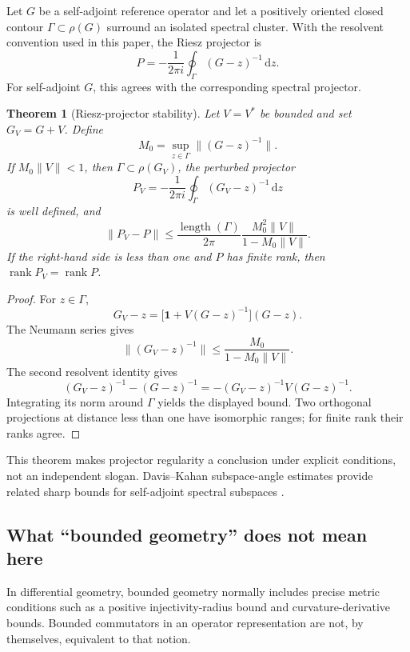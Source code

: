 \documentclass[11pt]{article}
\newtheorem{theorem}{Theorem}[section]
\theoremstyle{definition}
\theoremstyle{remark}
\newcommand{\1}{\mathbf 1}
\newcommand{\dd}{\mathrm d}
\begin{document}
Let \(G\) be a self-adjoint reference operator and let a positively
oriented closed contour \(\Gamma\subset\rho(G)\) surround an isolated
spectral cluster.  With the resolvent convention used in this paper, the
Riesz projector is
\[
  P
  =
  -\frac{1}{2\pi i}
  \oint_\Gamma (G-z)^{-1}\,\dd z.
\]
For self-adjoint \(G\), this agrees with the corresponding spectral
projector.

\begin{theorem}[Riesz-projector stability]
\label{thm:riesz}
Let \(V=V^*\) be bounded and set \(G_V=G+V\).  Define
\[
  M_0=\sup_{z\in\Gamma}\|(G-z)^{-1}\|.
\]
If \(M_0\|V\|<1\), then
\(\Gamma\subset\rho(G_V)\), the perturbed projector
\[
  P_V
  =
  -\frac{1}{2\pi i}
  \oint_\Gamma(G_V-z)^{-1}\,\dd z
\]
is well defined, and
\[
\|P_V-P\|
\leq
\frac{\operatorname{length}(\Gamma)}{2\pi}
\frac{M_0^2\|V\|}{1-M_0\|V\|}.
\]
If the right-hand side is less than one and \(P\) has finite rank, then
\(\operatorname{rank}P_V=\operatorname{rank}P\).
\end{theorem}

\begin{proof}
For \(z\in\Gamma\),
\[
G_V-z
=
\bigl[\1+V(G-z)^{-1}\bigr](G-z).
\]
The Neumann series gives
\[
\|(G_V-z)^{-1}\|
\leq
\frac{M_0}{1-M_0\|V\|}.
\]
The second resolvent identity gives
\[
(G_V-z)^{-1}-(G-z)^{-1}
=
-(G_V-z)^{-1}V(G-z)^{-1}.
\]
Integrating its norm around \(\Gamma\) yields the displayed bound.  Two
orthogonal projections at distance less than one have isomorphic ranges;
for finite rank their ranks agree.
\end{proof}

This theorem makes projector regularity a conclusion under explicit
conditions, not an independent slogan.  Davis--Kahan subspace-angle
estimates provide related sharp bounds for self-adjoint spectral
subspaces \cite{DavisKahan1970}.

\subsection{What ``bounded geometry'' does not mean here}

In differential geometry, bounded geometry normally includes precise
metric conditions such as a positive injectivity-radius bound and
curvature-derivative bounds.  Bounded commutators in an operator
representation are not, by themselves, equivalent to that notion.
\end{document}

